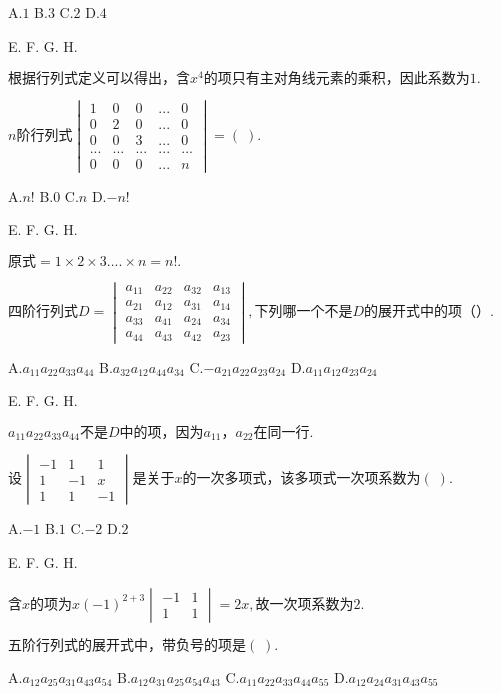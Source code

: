 A.$1$   B.$3$   C.$2$   D.$4$

E.   F.   G.   H.

$\mathrm{根据行列式定义可以得出}，含x^4\mathrm{的项只有主对角线元素的乘积}，\mathrm{因此系数为}1.$


$n\mathrm{阶行列式}\begin{vmatrix}1&0&0&...&0\\0&2&0&...&0\\0&0&3&...&0\\...&...&...&...&...\\0&0&0&...&n\end{vmatrix}=(\;).$

A.$n!$   B.$0$   C.$n$   D.$-n!$

E.   F.   G.   H.

$\mathrm{原式}=1\times2\times3....\times n=n!.$


$\mathrm{四阶行列式}D=\begin{vmatrix}a_{11}&a_{22}&a_{32}&a_{13}\\a_{21}&a_{12}&a_{31}&a_{14}\\a_{33}&a_{41}&a_{24}&a_{34}\\a_{44}&a_{43}&a_{42}&a_{23}\end{vmatrix},\mathrm{下列哪一个不是}D\mathrm{的展开式中的项}（）.$

A.$a_{11}a_{22}a_{33}a_{44}$   B.$a_{32}a_{12}a_{44}a_{34}$   C.$-a_{21}a_{22}a_{23}a_{24}$   D.$a_{11}a_{12}a_{23}a_{24}$

E.   F.   G.   H.

$a_{11}a_{22}a_{33}a_{44}\mathrm{不是}D\mathrm{中的项}，\mathrm{因为}a_{11}，a_{22}\mathrm{在同一行}.$


$设\begin{vmatrix}-1&1&1\\1&-1&x\\1&1&-1\end{vmatrix}\mathrm{是关于}x\mathrm{的一次多项式}，\mathrm{该多项式一次项系数为}(\;).$

A.$-1$   B.$1$   C.$-2$   D.$2$

E.   F.   G.   H.

$含x\mathrm{的项为}x(-1)^{2+3}\begin{vmatrix}-1&1\\1&1\end{vmatrix}=2x,\mathrm{故一次项系数为}2.$


$\mathrm{五阶行列式的展开式中}，\mathrm{带负号的项是}(\;).$

A.$a_{12}a_{25}a_{31}a_{43}a_{54}$   B.$a_{12}a_{31}a_{25}a_{54}a_{43}$   C.$a_{11}a_{22}a_{33}a_{44}a_{55}$   D.$a_{12}a_{24}a_{31}a_{43}a_{55}$

